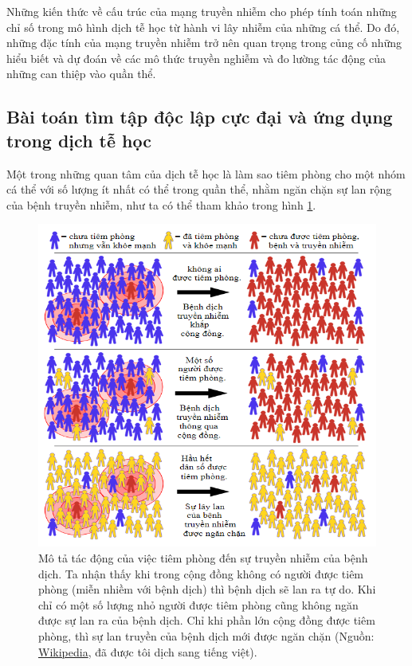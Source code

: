 \documentclass[14pt, oneside, a4paper, openany]{scrartcl}
\begin{document}
Những kiến thức về cấu trúc của mạng truyền nhiễm cho phép tính toán những chỉ số trong mô hình dịch tễ học từ hành vi lây nhiễm của những cá thể. Do đó, những đặc tính của mạng truyền nhiễm trở nên quan trọng trong củng cố những hiểu biết và dự đoán về các mô thức truyền nghiễm và đo lường tác động của những can thiệp vào quần thể.

\subsection{Bài toán tìm tập độc lập cực đại và ứng dụng trong dịch tễ học}

Một trong những quan tâm của dịch tễ học là làm sao tiêm phòng cho một nhóm cá thể với số lượng ít nhất có thể trong quần thể, nhằm ngăn chặn sự lan rộng của bệnh truyền nhiễm, như ta có thể tham khảo trong hình \ref{fig:epidemiology}.

\begin{figure}[!h]
	\centering
	\includegraphics[scale=0.8]{figures/Herd_immunity_vn_2.png} 
	\caption[Mô tả tác động của việc tiêm phòng đến sự truyền nhiễm của bệnh dịch]{Mô tả tác động của việc tiêm phòng đến sự truyền nhiễm của bệnh dịch. Ta nhận thấy khi trong cộng đồng không có người được tiêm phòng (miễn nhiềm với bệnh dịch) thì bệnh dịch sẽ lan ra tự do. Khi chỉ có một số lượng nhỏ người được tiêm phòng cũng không ngăn được sự lan ra của bệnh dịch. Chỉ khi phần lớn cộng đồng được tiêm phòng, thì sự lan truyền của bệnh dịch mới được ngăn chặn (Nguồn: \href{https://en.wikipedia.org/wiki/Herd\_immunity}{Wikipedia}, đã được tôi dịch sang tiếng việt).}
	\label{fig:epidemiology}
\end{figure}
\end{document}
